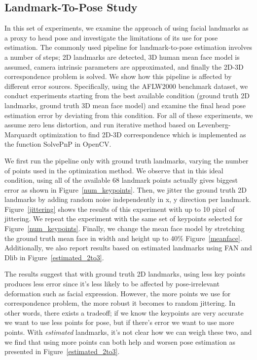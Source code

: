 \documentclass[10pt,twocolumn,letterpaper]{article}
\begin{document}
\subsection{Landmark-To-Pose Study}\label{sec4-B}
In this set of experiments, we examine the approach of using facial landmarks as a proxy to head pose and investigate the limitations of its use for pose estimation. The commonly used pipeline for landmark-to-pose estimation involves a number of steps; 2D landmarks are detected, 3D human mean face model is assumed, camera intrinsic parameters are approximated, and finally the 2D-3D correspondence problem is solved. We show how this pipeline is affected by different error sources. Specifically, using the AFLW2000 benchmark dataset, we conduct experiments starting from the best available condition (ground truth 2D landmarks, ground truth 3D mean face model) and examine the final head pose estimation error by deviating from this condition. For all of these experiments, we assume zero lens distortion, and run iterative method based on Levenberg-Marquardt optimization to find 2D-3D correspondence which is implemented as the function SolvePnP in OpenCV.

We first run the pipeline only with ground truth landmarks, varying the number of points used in the optimization method. We observe that in this ideal condition, using all of the available 68 landmark points actually gives biggest error as shown in Figure~\ref{num_keypoints}. Then, we jitter the ground truth 2D landmarks by adding random noise independently in x, y direction per landmark. Figure~\ref{jittering} shows the results of this experiment with up to 10 pixel of jittering. We repeat the experiment with the same set of keypoints selected for Figure~\ref{num_keypoints}. Finally, we change the mean face model by stretching the ground truth mean face in width and height up to 40\% Figure~\ref{meanface}. Additionally, we also report results based on estimated landmarks using FAN and Dlib in Figure~\ref{estimated_2to3}.

The results suggest that with ground truth 2D landmarks, using less key points produces less error since it's less likely to be affected by pose-irrelevant deformation such as facial expression. However, the more points we use for correspondence problem, the more robust it becomes to random jittering. In other words, there exists a tradeoff; if we know the keypoints are very accurate we want to use less points for pose, but if there's error we want to use more points. With \textit{estimated} landmarks, it's not clear how we can weigh these two, and we find that using more points can both help and worsen pose estimation as presented in Figure~\ref{estimated_2to3}.
\end{document}
